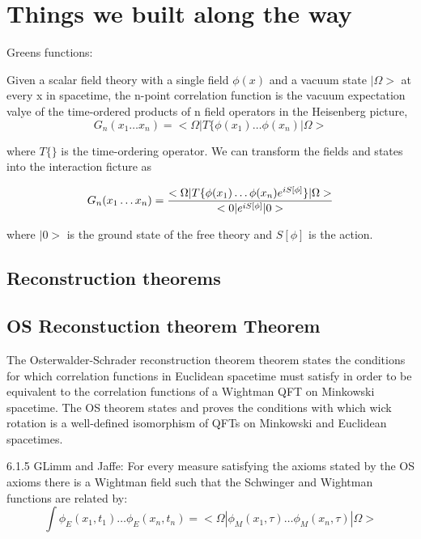 \documentclass{article}
\newcommand{\1}{\mathbbm{1}}
\theoremstyle{plain}
\theoremstyle{definition}
\numberwithin{equation}{section}
\begin{document}
\section{Things we built along the way}

Greens functions:

Given a scalar field theory with a single field $\phi(x) $ and a vacuum state $| \Omega>$ at every x in spacetime, the n-point correlation function is the vacuum expectation valye of the time-ordered products of n field operators in the Heisenberg picture, 
\begin{equation}
    G_n(x_1 \ldots x_n)= < \Omega | T \{ \phi(x_1) \ldots \phi(x_n) | \Omega>
\end{equation}

where $T\{\}$ is the time-ordering operator. We can transform the fields and states into the interaction ficture as 

\begin{equation}
    G_n(x_1 \ldots x_n)={< \Omega|T \{ \phi(x_1) \ldots \phi(x_n) e^{i S[\phi]}
    \} |\Omega> \over <0| e^{i S[\phi]}|0>}
\end{equation}

where $|0>$ is the ground state of the free theory and $S[\phi]$ is the action. 

\subsection{Reconstruction theorems}

\subsection{OS Reconstuction theorem Theorem}\label{OStheorems}

The Osterwalder-Schrader reconstruction theorem  theorem states the conditions for which correlation functions in Euclidean spacetime must satisfy in order to be equivalent to the correlation functions of a Wightman QFT on Minkowski spacetime. The OS theorem states and proves the conditions with which wick rotation is a well-defined isomorphism of QFTs on Minkowski and Euclidean spacetimes. 

6.1.5 GLimm and Jaffe: For every measure satisfying the axioms stated by the OS axioms there is a Wightman field such that the Schwinger and Wightman functions are related by: 
\begin{equation}
    \int \phi_E (x_1, t_1) \ldots \phi_E(x_n, t_n)= < \Omega| \phi_M(x_1, \tau) \ldots \phi_M(x_n, \tau) | \Omega> 
\end{equation}
\end{document}
